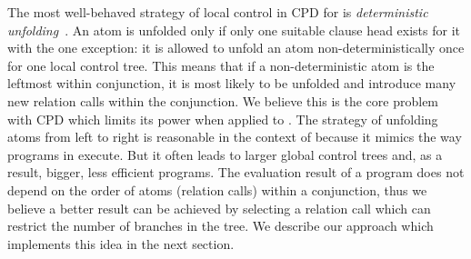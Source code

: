 The most well-behaved strategy of local control in CPD for \pro is \emph{deterministic unfolding}~\cite{leuschel1997advanced}.
An atom is unfolded only if only one suitable clause head exists for it with the one exception: it is allowed to unfold an atom non-deterministically once for one local control tree.
This means that if a non-deterministic atom is the leftmost within conjunction, it is most likely to be unfolded and introduce many new relation calls within the conjunction.
We believe this is the core problem with CPD which limits its power when applied to \mk.
The strategy of unfolding atoms from left to right is reasonable in the context of \pro because it mimics the way programs in \pro execute.
But it often leads to larger global control trees and, as a result, bigger, less efficient programs.
The evaluation result of a \mk program does not depend on the order of atoms (relation calls) within a conjunction, thus we believe a better result can be achieved by selecting a relation call which can restrict the number of branches in the tree.
We describe our approach which implements this idea in the next section.
